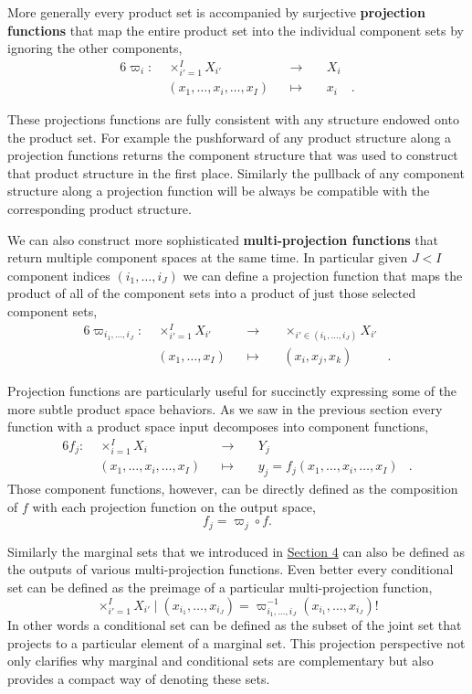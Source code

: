 \documentclass[
  letterpaper,
  DIV=11,
  numbers=noendperiod]{scrartcl}
\begin{document}
More generally every product set is accompanied by surjective
\textbf{projection functions} that map the entire product set into the
individual component sets by ignoring the other components,
\begin{alignat*}{6}
\varpi_{i} :\; & \times_{i' = 1}^{I} X_{i'} & &\rightarrow& \; & X_{i} &
\\
& (x_{1}, \ldots, x_{i}, \ldots, x_{I}) & &\mapsto& & x_{i} &.
\end{alignat*}

These projections functions are fully consistent with any structure
endowed onto the product set. For example the pushforward of any product
structure along a projection functions returns the component structure
that was used to construct that product structure in the first place.
Similarly the pullback of any component structure along a projection
function will be always be compatible with the corresponding product
structure.

We can also construct more sophisticated \textbf{multi-projection
functions} that return multiple component spaces at the same time. In
particular given \(J < I\) component indices
\(( i_{1}, \ldots, i_{J} )\) we can define a projection function that
maps the product of all of the component sets into a product of just
those selected component sets, \begin{alignat*}{6}
\varpi_{i_{1}, \ldots, i_{J}} :\; & \times_{i' = 1}^{I} X_{i'} & &\rightarrow& \;
& \times_{ i' \in ( i_{1}, \ldots, i_{J} ) } X_{i'} &
\\
& (x_{1}, \ldots, x_{I}) & &\mapsto& & (x_{i}, x_{j}, x_{k}) &.
\end{alignat*}

Projection functions are particularly useful for succinctly expressing
some of the more subtle product space behaviors. As we saw in the
previous section every function with a product space input decomposes
into component functions, \begin{alignat*}{6}
f_{j} :\; & \times_{i = 1}^{I} X_{i} & &\rightarrow& \; & Y_{j} &
\\
& (x_{1}, \ldots, x_{i}, \ldots, x_{I}) & &\mapsto&
& y_{j} = f_{j}(x_{1}, \ldots, x_{i}, \ldots, x_{I}) &.
\end{alignat*} Those component functions, however, can be directly
defined as the composition of \(f\) with each projection function on the
output space, \[
f_{j} = \varpi_{j} \circ f.
\]

Similarly the marginal sets that we introduced in
\href{@sec:decomposition}{Section 4} can also be defined as the outputs
of various multi-projection functions. Even better every conditional set
can be defined as the preimage of a particular multi-projection
function, \[
\times_{i' = 1}^{I} X_{i'} \mid (x_{i_{1}}, \ldots, x_{i_{J}})
=
\varpi_{i_{1}, \ldots, i_{J}}^{-1}(x_{i_{1}}, \ldots, x_{i_{J}})!
\] In other words a conditional set can be defined as the subset of the
joint set that projects to a particular element of a marginal set. This
projection perspective not only clarifies why marginal and conditional
sets are complementary but also provides a compact way of denoting these
sets.
\end{document}
